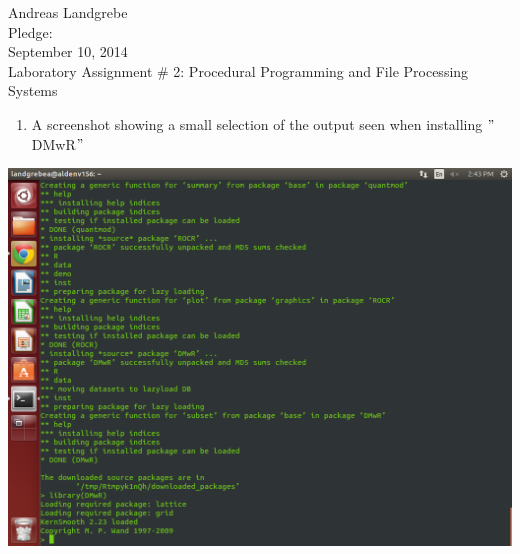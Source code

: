 \documentclass{article}
\begin{document}
\begin{center}
\Large
Andreas Landgrebe
\\
Pledge:
\\
September 10, 2014
\\
Laboratory Assignment \# 2: Procedural Programming and File Processing Systems
\\

\end{center}
\newpage
\begin{enumerate}
\item A screenshot showing a small selection of the output seen when installing $"$DMwR$"$
\end{enumerate}
\begin{center}

\includegraphics[scale=0.45]{Part1.png}
\end{center}
\end{document}
